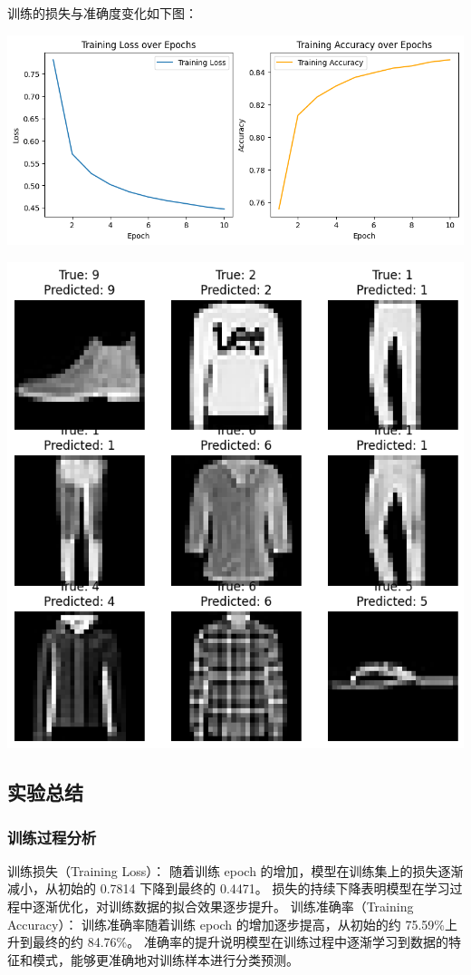 \documentclass[a4paper,12pt]{article}
\begin{document}
训练的损失与准确度变化如下图：

\centering %
\includegraphics[width=0.8\linewidth]{images/lab1_2_loss.png}


\includegraphics[width=0.8\linewidth]{images/lab1_2_result.png}

\justifying
\subsection{实验总结}
\subsubsection{训练过程分析}
训练损失（Training Loss）：
随着训练 epoch 的增加，模型在训练集上的损失逐渐减小，从初始的 0.7814 下降到最终的 0.4471。
损失的持续下降表明模型在学习过程中逐渐优化，对训练数据的拟合效果逐步提升。
训练准确率（Training Accuracy）：
训练准确率随着训练 epoch 的增加逐步提高，从初始的约 75.59\%上升到最终的约 84.76\%。
准确率的提升说明模型在训练过程中逐渐学习到数据的特征和模式，能够更准确地对训练样本进行分类预测。
\end{document}
